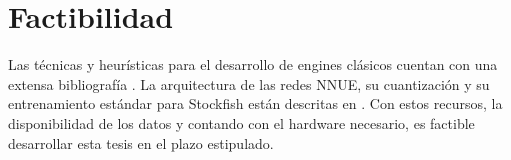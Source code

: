\section*{Factibilidad}

Las técnicas y heurísticas para el desarrollo de engines clásicos cuentan con una extensa bibliografía \cite{cpw}. La arquitectura de las redes NNUE, su cuantización y su entrenamiento estándar para Stockfish están descritas en \cite{nnue-pytorch}. Con estos recursos, la disponibilidad de los datos \cite{lichessdb} y contando con el hardware necesario, es factible desarrollar esta tesis en el plazo estipulado.
